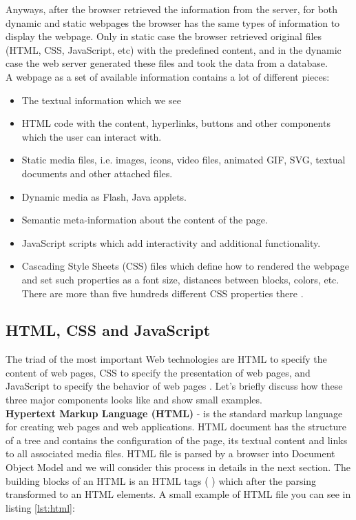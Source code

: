 Anyways, after the browser retrieved the information from the server, for both dynamic and static webpages the browser has the same types of information to display the webpage. Only in static case the browser retrieved original files (HTML, CSS, JavaScript, etc)  with the predefined content, and in the dynamic case the web server generated these files and took the data from a database.\\

A webpage as a set of available information contains a lot of different pieces:

\begin{itemize}
    \item The textual information which we see
    \item HTML code with the content, hyperlinks, buttons and other components which the user can interact with.
    \item Static media files, i.e. images, icons, video files, animated GIF, SVG, textual documents and other attached files.
    \item Dynamic media as Flash, Java applets.
    \item Semantic meta-information about the content of the page.
    \item JavaScript scripts which add interactivity and additional functionality.
    \item Cascading Style Sheets (CSS) files which define how to rendered the webpage and set such properties as a font size, distances between blocks, colors, etc. There are more than five hundreds different CSS properties there \cite{W3Schools}.
\end{itemize}

\subsection{HTML, CSS and JavaScript}
The triad of the most important Web technologies are HTML to specify the content of web pages, CSS to specify the presentation of web pages, and JavaScript to specify the behavior of web pages \cite{JSBook}. Let's briefly discuss how these three major components looks like and show small examples.\\

\noindent\textbf{Hypertext Markup Language (HTML)} - is the standard markup language for creating web pages and web applications. HTML document has the structure of a tree and contains the configuration of the page, its textual content and links to all associated media files. HTML file is parsed by a browser into Document Object Model and we will consider this process in details in the next section. The building blocks of an HTML is an HTML tags ( )  which after the parsing transformed to an HTML elements. A small example of HTML file you can see in listing \ref{lst:html}: \\

